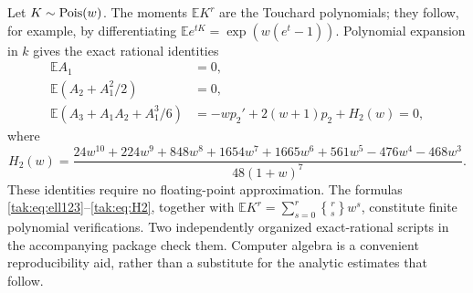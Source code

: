 \documentclass[11pt,letterpaper]{article}
\theoremstyle{remark}\newtheorem{remark}[theorem]{Remark}
\newcommand{\E}{\mathbb E}\newcommand{\Pp}{\mathbb P}
\begin{document}
Let $K\sim\operatorname{Pois}(w)$. The moments $\E K^r$ are the Touchard polynomials; they follow, for example, by differentiating
$\E e^{tK}=\exp(w(e^t-1))$. Polynomial expansion in $k$ gives the exact rational identities
\begin{align}
 \E A_1&=0,\label{tak:eq:cancels}\\
 \E(A_2+A_1^2/2)&=0,\nonumber\\
 \E(A_3+A_1A_2+A_1^3/6)
   &=-wp_2'+2(w+1)p_2+H_2(w)=0,\nonumber
\end{align}
where
\begin{equation}
 H_2(w)=\frac{24w^{10}+224w^9+848w^8+1654w^7+1665w^6+561w^5-476w^4-468w^3}
                {48(1+w)^7}.\label{tak:eq:H2}
\end{equation}
These identities require no floating-point approximation. The formulas \eqref{tak:eq:ell123}--\eqref{tak:eq:H2}, together with $\E K^r=\sum_{s=0}^r\genfrac{\{} {\}} {0pt} {} {r} {s}w^s$, constitute finite polynomial verifications. Two independently organized exact-rational scripts in the accompanying package check them. Computer algebra is a convenient reproducibility aid, rather than a substitute for the analytic estimates that follow.
\end{document}
